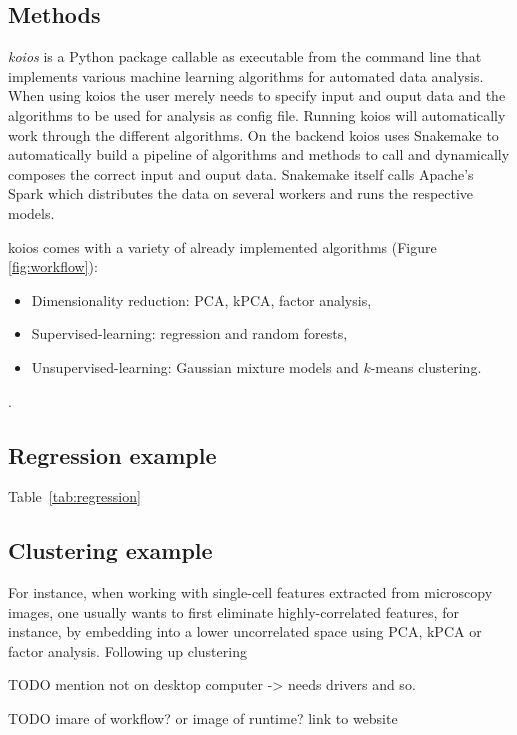 \documentclass{bioinfo}
\begin{document}
\begin{methods}
\section{Methods}
\textit{koios} is a Python package
callable as executable from the command line that implements various machine learning algorithms for automated data analysis. When using koios the user merely needs to specify input and ouput data and the algorithms to be used for analysis as config file. Running koios will automatically work through the different algorithms. On the backend koios uses Snakemake \citep{snakemake} to automatically build a pipeline of algorithms and methods to call and dynamically composes the correct input and ouput data. Snakemake itself calls Apache's Spark which distributes the data on several workers and runs the respective models.

koios comes with a variety of already implemented algorithms (Figure \ref{fig:workflow}):
\begin{itemize}
\item Dimensionality reduction: PCA, kPCA, factor analysis, 
\item Supervised-learning: regression and random forests,
\item Unsupervised-learning: Gaussian mixture models and $k$-means clustering.
\end{itemize}.

\subsection{Regression example}
Table~\ref{tab:regression}


\subsection{Clustering example}

For instance, when working with single-cell features extracted from microscopy images, one usually wants to first eliminate highly-correlated features, for instance, by embedding into a lower uncorrelated space using PCA, kPCA or factor analysis. Following up clustering

TODO mention not on desktop computer -> needs drivers and so.

\end{methods}

TODO imare of workflow? or image of runtime?
link to website
\end{document}
